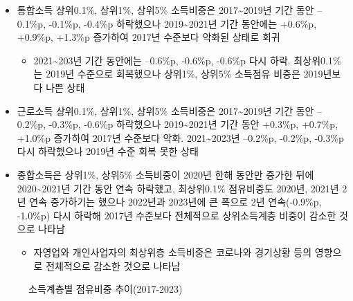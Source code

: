 \documentclass[
  a4paper,
  oneside,
  open=any]{scrbook}
\providecommand{\tightlist}{%
  \setlength{\itemsep}{0pt}\setlength{\parskip}{0pt}}\usepackage{longtable,booktabs,array}
\begin{document}
\begin{itemize}
\item
  통합소득 상위0.1\%, 상위1\%, 상위5\% 소득비중은
  2017\textasciitilde2019년 기간 동안 --0.1\%p, -0.1\%p, -0.4\%p
  하락했으나 2019\textasciitilde2021년 기간 동안에는 +0.6\%p, +0.9\%p,
  +1.3\%p 증가하여 2017년 수준보다 악화된 상태로 회귀

  \begin{itemize}
  \tightlist
  \item
    2021\textasciitilde203년 기간 동안에는 --0.6\%p, -0.6\%p, -0.6\%p
    다시 하락. 최상위0.1\%는 2019년 수준으로 회복했으나 상위1\%, 상위5\%
    소득점유 비중은 2019년보다 나쁜 상태
  \end{itemize}
\item
  근로소득 상위0.1\%, 상위1\%, 상위5\% 소득비중은
  2017\textasciitilde2019년 기간 동안 --0.2\%p, -0.3\%p, -0.6\%p
  하락했으나 2019\textasciitilde2021년 기간 동안 +0.3\%p, +0.7\%p,
  +1.0\%p 증가하여 2017년 수준보다 악화. 2021\textasciitilde2023년
  --0.2\%p, -0.2\%p, -0.3\%p 다시 하락헸으나 2019년 수준 회복 못한 상태
\item
  종합소득은 상위1\%, 상위5\% 소득비중이 2020년 한해 동안만 증가한 뒤에
  2020\textasciitilde2021년 기간 동안 연속 하락했고, 최상위0.1\%
  점유비중도 2020년, 2021년 2년 연속 증가하기는 했으나 2022년과 2023년에
  큰 폭으로 2년 연속(-0.9\%p, -1.0\%p) 다시 하락해 2017년 수준보다
  전체적으로 상위소득계층 비중이 감소한 것으로 나타남

  \begin{itemize}
  \tightlist
  \item
    자영업와 개인사업자의 최상위층 소득비중은 코로나와 경기상황 등의
    영향으로 전체적으로 감소한 것으로 나타남
  \end{itemize}
\end{itemize}

\begin{figure}

\caption{\label{fig-cocons}소득계층별 점유비중 추이(2017-2023)}


\end{figure}%
\end{document}
